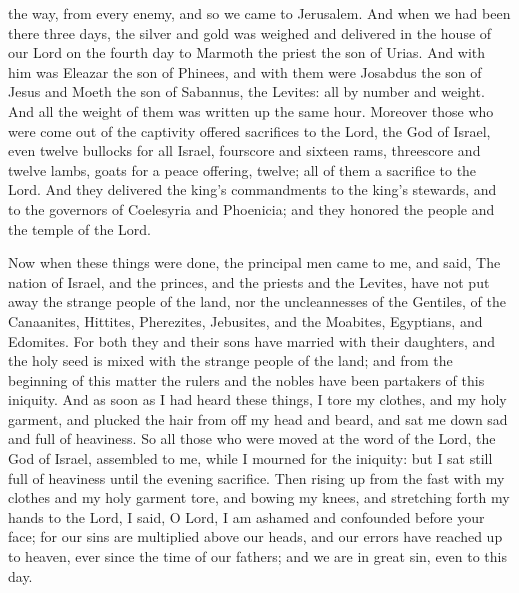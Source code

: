 {{} the way, from every enemy, and so we came to Jerusalem.
And when we had been there three days, the silver and gold was weighed and delivered in the house of our Lord on the fourth day to
 Marmoth the priest the son of
 Urias.
And with him was Eleazar the son of Phinees, and with them were Josabdus the son of Jesus and
 Moeth the son of Sabannus, the Levites: all
{} by number and weight.
And all the weight of them was written up the same hour.
Moreover those who were come out of the captivity offered sacrifices to the Lord, the God of Israel, even twelve bullocks for all Israel, fourscore and sixteen rams,
threescore and twelve lambs, goats for a peace offering, twelve; all of them a sacrifice to the Lord.
And they delivered the king’s commandments to the king’s stewards, and to the governors of Coelesyria and Phoenicia; and they honored the people and the temple of the Lord.
\par }{\PP {}Now when these things were done, the principal men came to me, and said,
The nation of Israel, and the princes, and the priests and the Levites, have not put away
{} the strange people of the land,
 nor the uncleannesses of the Gentiles,
{} of the Canaanites, Hittites, Pherezites, Jebusites, and the Moabites, Egyptians, and Edomites.
For both they and their sons have married with their daughters, and the holy seed is mixed with the strange people of the land; and from the beginning of this matter the rulers and the nobles have been partakers of this iniquity.
And as soon as I had heard these things, I tore my clothes, and my holy garment, and plucked the hair from off my head and beard, and sat me down sad and full of heaviness.
So all those who were moved at the word of the Lord, the God of Israel, assembled to me, while I mourned for the iniquity: but I sat still full of heaviness until the evening sacrifice.
Then rising up from the fast with my clothes and my holy garment tore, and bowing my knees, and stretching forth my hands to the Lord,
I said, O Lord, I am ashamed and confounded before your face;
for our sins are multiplied above our heads, and our errors have reached up to heaven,
ever since the time of our fathers; and we are in great sin, even to this day.
}
